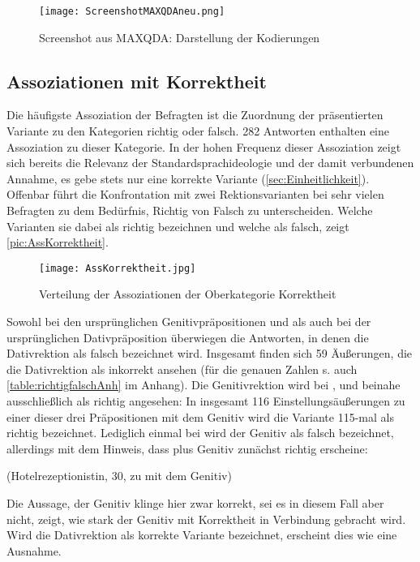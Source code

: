 \begin{figure}
\texttt{[image: ScreenshotMAXQDAneu.png]}
\caption{Screenshot aus MAXQDA: Darstellung der Kodierungen}
\label{pic:ScreenshotMAXQDA}
\end{figure}
\subsection{Assoziationen mit Korrektheit}
\label{sec:ErgAssKorrektheit}
Die häufigste Assoziation der Befragten ist die Zuordnung der präsentierten Variante zu den Kategorien \glqq richtig\grqq{} oder \glqq falsch\grqq. 
282 Antworten enthalten eine Assoziation zu dieser Kategorie. 
In der hohen Frequenz dieser Assoziation zeigt sich bereits die Relevanz der Standardsprachideologie und der damit verbundenen Annahme, es gebe stets nur eine korrekte Variante (\autoref{sec:Einheitlichkeit}). 
Offenbar führt die Konfrontation mit zwei Rektionsvarianten bei sehr vielen Befragten zu dem Bedürfnis, Richtig von Falsch zu unterscheiden. 
Welche Varianten sie dabei als richtig bezeichnen und welche als falsch, zeigt \autoref{pic:AssKorrektheit}. 

\begin{figure}
\texttt{[image: AssKorrektheit.jpg]}
\caption{Verteilung der Assoziationen der Oberkategorie \glqq Korrektheit\grqq}
\label{pic:AssKorrektheit}
\end{figure}
Sowohl bei den ursprünglichen Genitivpräpositionen \wegen{} und \waehrend{} als auch bei der ursprünglichen Dativpräposition \dank{} überwiegen die Antworten, in denen die Dativrektion als falsch bezeichnet wird. 
Insgesamt finden sich 59 Äußerungen, die die Dativrektion als inkorrekt ansehen (für die genauen Zahlen s. auch \autoref{table:richtigfalschAnh} im Anhang). 
Die Genitivrektion wird bei \wegen, \waehrend{} und \dank{} beinahe ausschließlich als richtig angesehen: 
In insgesamt 116 Einstellungsäußerungen zu einer dieser drei Präpositionen mit dem Genitiv wird die Variante 115-mal als richtig bezeichnet.
Lediglich einmal bei \dank{} wird der Genitiv als falsch bezeichnet, allerdings mit dem Hinweis, dass \dank{} plus Genitiv zunächst richtig erscheine: 
\begin{exe}
\ex {} (Hotelrezeptionistin, 30, zu \dank{} mit dem Genitiv)\label{Bsp:bemueht}
\end{exe}
Die Aussage, der Genitiv klinge hier zwar korrekt, sei es in diesem Fall aber nicht, zeigt, wie stark der Genitiv mit Korrektheit in Verbindung gebracht wird.
Wird die Dativrektion als korrekte Variante bezeichnet, erscheint dies wie eine Ausnahme. 


